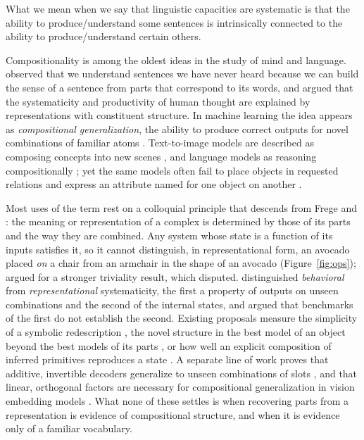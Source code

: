\documentclass[10pt]{article}
\theoremstyle{plain}
\theoremstyle{remark}
\begin{document}
\epigraph{What we mean when we say that linguistic capacities are systematic is that the ability to produce/understand some sentences is intrinsically connected to the ability to produce/understand certain others.}{\citet{fodor1988}}

Compositionality is among the oldest ideas in the study of mind and language. \citet{frege1923} observed that we understand sentences we have never heard because we can build the sense of a sentence from parts that correspond to its words, and \citet{fodor1988} argued that the systematicity and productivity of human thought are explained by representations with constituent structure. In machine learning the idea appears as \emph{compositional generalization}, the ability to produce correct outputs for novel combinations of familiar atoms \citep{lake2018,keysers2020,kim2020cogs}. Text-to-image models are described as composing concepts into new scenes \citep{ramesh2021,okawa2023}, and language models as reasoning compositionally \citep{press2023}; yet the same models often fail to place objects in requested relations \citep{conwell2022} and express an attribute named for one object on another \citep{rassin2022}.

Most uses of the term rest on a colloquial principle that descends from Frege and \citet{montague1970}: the meaning or representation of a complex is determined by those of its parts and the way they are combined. Any system whose state is a function of its inputs satisfies it, so it cannot distinguish, in representational form, an avocado placed \emph{on} a chair from an armchair in the shape of an avocado (Figure~\ref{fig:ops}); \citet{zadrozny1994} argued for a stronger triviality result, which \citet{westerstahl1998} disputed. \citet{vegner2025} distinguished \emph{behavioral} from \emph{representational} systematicity, the first a property of outputs on unseen combinations and the second of the internal states, and argued that benchmarks of the first do not establish the second. Existing proposals measure the simplicity of a symbolic redescription \citep{elmoznino2024}, the novel structure in the best model of an object beyond the best models of its parts \citep{elmoznino2026}, or how well an explicit composition of inferred primitives reproduces a state \citep{andreas2019}. A separate line of work proves that additive, invertible decoders generalize to unseen combinations of slots \citep{lachapelle2023,wiedemer2024}, and that linear, orthogonal factors are necessary for compositional generalization in vision embedding models \citep{uselis2026}. What none of these settles is when recovering parts from a representation is evidence of compositional structure, and when it is evidence only of a familiar vocabulary.
\end{document}
